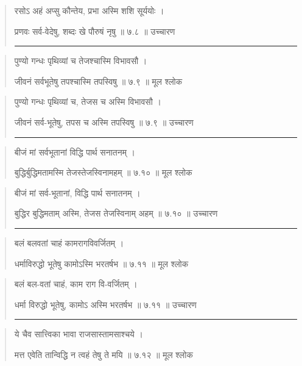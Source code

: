 \begin{quotation}
रसोऽ अहं अप्सु कौन्तेय, प्रभा अस्मि शशि सूर्ययोः  ।  

प्रणवः सर्व-वेदेषु, शब्दः खे पौरुषं नृषु  ॥ ७.८ ॥  उच्चारण

\noindent\rule{16cm}{0.4pt} 
\end{quotation}


\begin{quotation} 
पुण्यो गन्धः पृथिव्यां च तेजश्चास्मि विभावसौ  ।  

जीवनं सर्वभूतेषु तपश्चास्मि तपस्विषु  ॥ ७.९ ॥  मूल श्लोक
\end{quotation}

\begin{quotation}
पुण्यो गन्धः पृथिव्यां च, तेजस च अस्मि विभावसौ  ।  

जीवनं सर्व-भूतेषु, तपस च अस्मि तपस्विषु  ॥ ७.९ ॥  उच्चारण

\noindent\rule{16cm}{0.4pt} 
\end{quotation}


\begin{quotation} 
बीजं मां सर्वभूतानां विद्धि पार्थ सनातनम्‌  ।  

बुद्धिर्बुद्धिमतामस्मि तेजस्तेजस्विनामहम्‌  ॥ ७.१० ॥  मूल श्लोक
\end{quotation}

\begin{quotation}
बीजं मां सर्व-भूतानां, विद्धि पार्थ सनातनम्‌  ।  

बुद्धिर बुद्धिमताम् अस्मि, तेजस तेजस्विनाम् अहम्‌  ॥ ७.१० ॥  उच्चारण

\noindent\rule{16cm}{0.4pt} 
\end{quotation}


\begin{quotation} 
बलं बलवतां चाहं कामरागविवर्जितम्‌  ।  

धर्माविरुद्धो भूतेषु कामोऽस्मि भरतर्षभ  ॥ ७.११ ॥  मूल श्लोक
\end{quotation}

\begin{quotation}
बलं बल-वतां चाहं, काम राग वि-वर्जितम्‌  ।  

धर्मा विरुद्धो भूतेषु, कामोऽ अस्मि भरतर्षभ  ॥ ७.११ ॥  उच्चारण

\noindent\rule{16cm}{0.4pt} 
\end{quotation}


\begin{quotation} 
ये चैव सात्त्विका भावा राजसास्तामसाश्चये  ।  

मत्त एवेति तान्विद्धि न त्वहं तेषु ते मयि  ॥ ७.१२ ॥  मूल श्लोक
\end{quotation}

